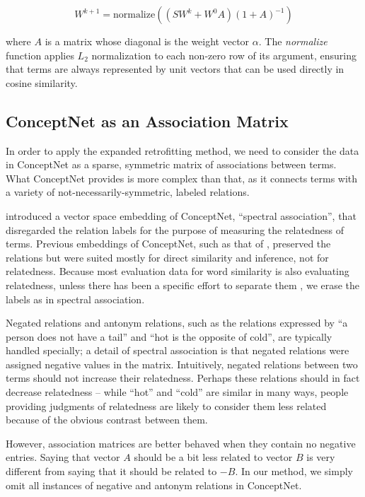 \documentclass[11pt,letterpaper]{article}
\begin{document}
$$
W^{k+1} = \mathrm{normalize}\left( \left( S W^k + W^0 A \right)\left( 1 + A \right)^{-1} \right)
$$

where $A$ is a matrix whose diagonal is the weight vector $\alpha$. The {\em normalize}
function applies $L_2$ normalization to each non-zero row of its argument, ensuring
that terms are always represented by unit vectors that can be used directly in
cosine similarity.

\subsection{ConceptNet as an Association Matrix}

In order to apply the expanded retrofitting method, we need to consider the data in
ConceptNet as a sparse, symmetric matrix of associations between terms. What
ConceptNet provides is more complex than that, as it connects terms with a
variety of not-necessarily-symmetric, labeled relations.

 introduced a vector space embedding of ConceptNet,
``spectral association'', that disregarded the relation labels for the purpose
of measuring the relatedness of terms. Previous embeddings of ConceptNet, such
as that of , preserved the relations but were
suited mostly for direct similarity and inference, not for relatedness. Because
most evaluation data for word similarity is also evaluating relatedness, unless
there has been a specific effort to separate them \cite{agirre2009similarity},
we erase the labels as in spectral association.

Negated relations and antonym relations, such as the relations expressed by
``a person does not have a tail'' and ``hot is the opposite of cold'', are
typically handled specially; a detail of spectral association is that negated
relations were assigned negative values in the matrix. Intuitively, negated
relations between two terms should not increase their relatedness. Perhaps
these relations should in fact decrease relatedness -- while ``hot'' and
``cold'' are similar in many ways, people providing judgments of relatedness
are likely to consider them less related because of the obvious contrast
between them.

However, association matrices are better behaved when they contain no negative
entries. Saying that vector $A$ should be a bit less related to vector
$B$ is very different from saying that it should be related to $-B$.
In our method, we simply omit all instances of negative and antonym
relations in ConceptNet.
\end{document}
